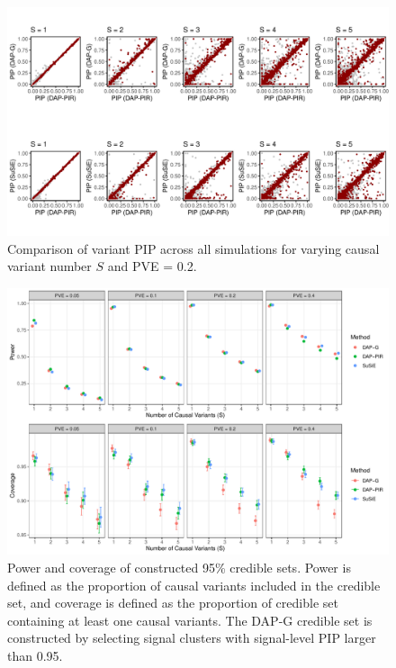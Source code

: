 \documentclass[pdflatex,sn-mathphys-num]{sn-jnl}%
\theoremstyle{thmstyleone}%
\theoremstyle{thmstyletwo}%
\theoremstyle{thmstylethree}%
\begin{document}
\begin{figure}[H]
    \centering
    \includegraphics[width=1\textwidth]{files/plot_pip_comparison.png}
    \caption{Comparison of variant PIP across all simulations for varying causal variant number $S$ and PVE = 0.2.}
    \label{fig:gtex_comparison}
\end{figure}



\begin{figure}[H]
    \centering
    \includegraphics[width=1\textwidth]{files/plot_coverage.pdf}
    \caption{Power and coverage of constructed 95\% credible sets. Power is defined as the proportion of causal variants included in the credible set, and coverage is defined as the proportion of credible set containing at least one causal variants. The DAP-G credible set is constructed by selecting signal clusters with signal-level PIP larger than 0.95.}
    \label{fig:coverage}
\end{figure}
\end{document}

